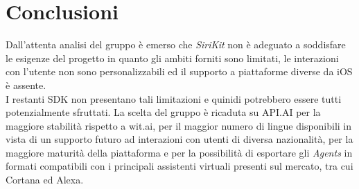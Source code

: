 \documentclass[a4paper,titlepage]{article}
\begin{document}
	\section{Conclusioni}
	Dall'attenta analisi del gruppo \GRUPPO{} è emerso che \textit{SiriKit} non è adeguato a soddisfare le esigenze del progetto \PROGETTO{} in quanto gli ambiti forniti sono limitati, le interazioni con l'utente non sono personalizzabili ed il supporto a piattaforme diverse da iOS è assente.\\
	I restanti SDK non presentano tali limitazioni e quinidi potrebbero essere tutti potenzialmente sfruttati. La scelta del gruppo è ricaduta su API.AI per la maggiore stabilità rispetto a wit.ai, per il  maggior numero di lingue disponibili in vista di un supporto futuro ad interazioni con utenti di diversa nazionalità, per la maggiore maturità della piattaforma e per la possibilità di esportare gli \textit{Agents} in formati compatibili con i principali assistenti virtuali presenti sul mercato, tra cui Cortana ed Alexa.
	
	
	
\end{document}
